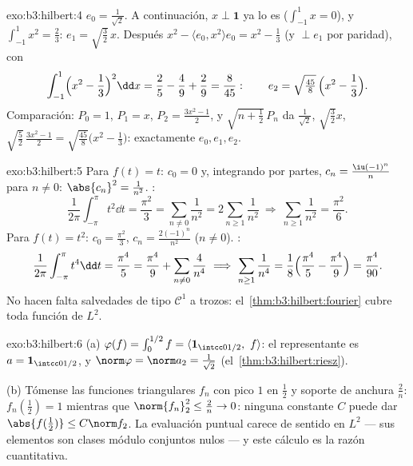 \begin{solution}{exo:b3:hilbert:4}
$e_0 = \frac1{\sqrt2}$. A continuación, $x \perp \mathbf 1$ ya lo es
($\int_{-1}^1x = 0$), y $\int_{-1}^1x^2 = \frac23$: $e_1 =
\sqrt{\tfrac32}\,x$. Después $x^2 - \langle e_0, x^2\rangle e_0 =
x^2 - \frac13$ (y $\perp e_1$ por paridad), con
\[
\int_{-1}^1\Bigl(x^2 - \frac13\Bigr)^2\dd x = \frac25 -
\frac49 + \frac29 = \frac{8}{45}:
\qquad e_2 = \sqrt{\tfrac{45}8}\,\Bigl(x^2 - \frac13\Bigr).
\]
Comparación: $P_0 = 1$, $P_1 = x$, $P_2 = \frac{3x^2 - 1}2$, y
$\sqrt{n + \tfrac12}\,P_n$ da $\frac1{\sqrt2}$, $\sqrt{\frac32}x$,
$\sqrt{\frac52}\,\frac{3x^2-1}2 =
\sqrt{\frac{45}8}\bigl(x^2 - \frac13\bigr)$: exactamente $e_0, e_1,
e_2$.
\end{solution}

\begin{solution}{exo:b3:hilbert:5}
Para $f(t) = t$: $c_0 = 0$ y, integrando por partes, $c_n =
\frac{\iu(-1)^n}{n}$ para $n \neq 0$: $\abs{c_n}^2 =
\frac1{n^2}$. :
\[
\frac1{2\pi}\int_{-\pi}^\pi t^2\dd t = \frac{\pi^2}3
= \sum_{n\neq0}\frac1{n^2} = 2\sum_{n\geq1}\frac1{n^2}
\ \Longrightarrow\ \sum_{n\geq1}\frac1{n^2} = \frac{\pi^2}6 .
\]
Para $f(t) = t^2$: $c_0 = \frac{\pi^2}3$, $c_n =
\frac{2(-1)^n}{n^2}$ ($n \ne 0$).
:
\[
\frac1{2\pi}\int_{-\pi}^{\pi}t^4\dd t = \frac{\pi^4}5
= \frac{\pi^4}9 + \sum_{n\neq0}\frac4{n^4}
\ \Longrightarrow\
\sum_{n\geq1}\frac1{n^4} = \frac18\Bigl(\frac{\pi^4}5 -
\frac{\pi^4}9\Bigr) = \frac{\pi^4}{90} .
\]
No hacen falta salvedades de tipo $\mathcal C^1$ a trozos:
el~\cref{thm:b3:hilbert:fourier} cubre toda función de $L^2$.
\end{solution}

\begin{solution}{exo:b3:hilbert:6}
(a) $\varphi(f) = \int_0^{1/2}f = \langle\mathbf
1_{\intcc0{1/2}},\ f\rangle$: el representante es $a =
\mathbf 1_{\intcc0{1/2}}$, y $\norm\varphi = \norm a_2 =
\frac1{\sqrt2}$ (el~\cref{thm:b3:hilbert:riesz}).

(b) Tómense las funciones triangulares $f_n$ con pico $1$ en $\frac12$ y
soporte de anchura $\frac2n$: $f_n(\tfrac12) = 1$ mientras que
$\norm{f_n}_2^2 \leq \frac2n \to 0$: ninguna constante $C$ puede dar
$\abs{f(\frac12)} \leq C\norm f_2$. La evaluación puntual carece de
sentido en $L^2$ --- sus elementos son clases módulo conjuntos nulos ---
y este cálculo es la razón cuantitativa.
\end{solution}


